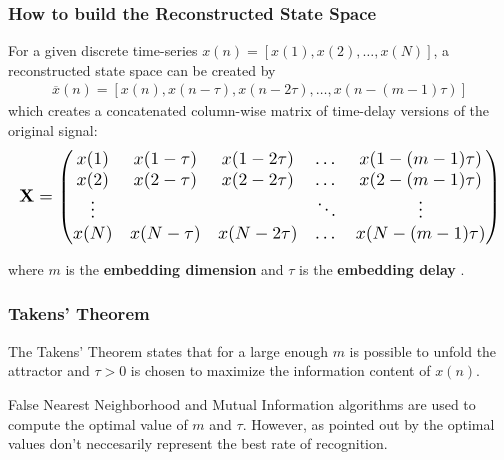 \documentclass{beamer}
\begin{document}
\begin{frame}
\frametitle{How to build the Reconstructed State Space}

\vspace{-10mm}
For a given discrete time-series $x(n) = [x(1) , x(2), \dots, x(N)]$,
a reconstructed state space can be created by
\begin{eqnarray*}
\overline{x}(n) = [ x(n), x(n - \tau), x(n-2\tau), \dots , x (n-(m-1)\tau) ]
\end{eqnarray*}
which creates a concatenated column-wise matrix of time-delay versions of the original signal:
\begin{equation}
  \resizebox{\textwidth}{!}{$\displaystyle
  \mathbf{X}
    = \begin{pmatrix} \nonumber
      x(1) & x(1 - \tau) & x(1-2\tau) & \dots & x (1-(m-1)\tau) \\
      x(2) & x(2 - \tau) & x(2-2\tau) & \dots & x (2-(m-1)\tau) \\
      \vdots &  &  & \ddots & \vdots \\
      x(N) & x(N - \tau) & x(N-2\tau) & \dots & x (N-(m-1)\tau) \\
      \end{pmatrix}
     $}
\end{equation}



where $m$ is the \textbf{ embedding dimension}  and  $\tau$ is the \textbf{ embedding delay}
\textcolor{red}{\textbf{  \cite{Takens1981} }}.


\end{frame}




\begin{frame}
\frametitle{Takens' Theorem}

The Takens' Theorem states that for a large enough $m$ is possible to unfold the attractor
and $\tau > 0$ is chosen to maximize the information content of $x(n)$.

\vspace{5mm}

False Nearest Neighborhood and Mutual Information algorithms are used to compute
the optimal value of $m$ and $\tau$. However, as pointed out by  \textcolor{red}{\textbf{ \cite{Sama2013} }}
the optimal values don't neccesarily represent the best rate of recognition.

\end{frame}
\end{document}
